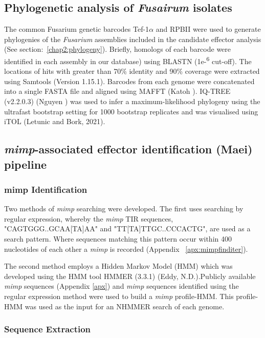 

\subsection{Phylogenetic analysis of \textit{Fusairum} isolates}


The common Fusarium genetic barcodes Tef-1\(\alpha\) and RPBII  were used to generate phylogenies of the \textit{Fusarium} assemblies included in the candidate effector analysis (See section:~\ref{chap2:phylogeny}). Briefly, homologs of each barcode were identified in each assembly in our database) using BLASTN (1e-\textsuperscript{6} cut-off). The locations of hits with greater than 70\% identity and 90\% coverage were extracted using Samtools (Version 1.15.1). Barcodes from each genome were concatenated into a single FASTA file and aligned using MAFFT (Katoh ). IQ-TREE (v2.2.0.3) (Nguyen ) was used to infer a maximum-likelihood phylogeny using the ultrafast bootstrap setting for 1000 bootstrap replicates and was visualised using iTOL (Letunic and Bork, 2021). 

\subsection{\textit{mimp}-associated effector identification (Maei) pipeline}

\subsubsection{\Ac{mimp} Identification}

Two methods of \textit{mimp} searching were developed. The first uses searching by regular expression, whereby the \textit{mimp} TIR sequences, "CAGTGGG..GCAA[TA]AA" and "TT[TA]TTGC..CCCACTG", are used as a search pattern. Where sequences matching this pattern occur within 400 nucleotides of each other a \textit{mimp} is recorded (Appendix ~\ref{apx:mimpfinditer}). 

The second method employs a Hidden Markov Model (HMM) which was developed using the HMM tool HMMER (3.3.1) (Eddy, N.D.).Publicly available \textit{mimp} sequences (Appendix \ref{apx}) and \textit{mimp} sequences identified using the regular expression method were used to build a \textit{mimp} profile-HMM. This profile-HMM was used as the input for an NHMMER search of each genome.

\subsubsection{Sequence Extraction}

